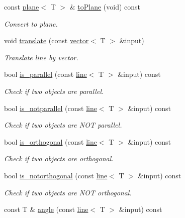 \begin{DoxyCompactItemize}
\mbox{\label{classddd_1_1line_a6727586814331ef291c60149a0c88c5a}} 
const \hyperlink{classddd_1_1plane}{plane}$<$ T $>$ \& \hyperlink{classddd_1_1line_a6727586814331ef291c60149a0c88c5a}{to\+Plane} (void) const
\begin{DoxyCompactList}\small\item\em Convert to plane. \end{DoxyCompactList}\item 
void \hyperlink{classddd_1_1line_a46e5ed85d7fe38fc3d4d4755b3f23568}{translate} (const \hyperlink{classddd_1_1vector}{vector}$<$ T $>$ \&input)
\begin{DoxyCompactList}\small\item\em Translate line by vector. \end{DoxyCompactList}\item 
bool \hyperlink{classddd_1_1line_aba281798b6743c8bbab01df3613325ac}{is\+\_\+parallel} (const \hyperlink{classddd_1_1line}{line}$<$ T $>$ \&input) const
\begin{DoxyCompactList}\small\item\em Check if two objects are parallel. \end{DoxyCompactList}\item 
bool \hyperlink{classddd_1_1line_a1cbafdf3998cbf4e154b272c29357124}{is\+\_\+notparallel} (const \hyperlink{classddd_1_1line}{line}$<$ T $>$ \&input) const
\begin{DoxyCompactList}\small\item\em Check if two objects are N\+OT parallel. \end{DoxyCompactList}\item 
bool \hyperlink{classddd_1_1line_a31170f8f74362954dc35ae189ba64984}{is\+\_\+orthogonal} (const \hyperlink{classddd_1_1line}{line}$<$ T $>$ \&input) const
\begin{DoxyCompactList}\small\item\em Check if two objects are orthogonal. \end{DoxyCompactList}\item 
bool \hyperlink{classddd_1_1line_a123c95c4ec684dc8b56fff2f9b9f4ac1}{is\+\_\+notorthogonal} (const \hyperlink{classddd_1_1line}{line}$<$ T $>$ \&input) const
\begin{DoxyCompactList}\small\item\em Check if two objects are N\+OT orthogonal. \end{DoxyCompactList}\item 
const T \& \hyperlink{classddd_1_1line_a3ce8f1109a657e646d0c334b19c79f53}{angle} (const \hyperlink{classddd_1_1line}{line}$<$ T $>$ \&input) const

\end{DoxyCompactItemize}

